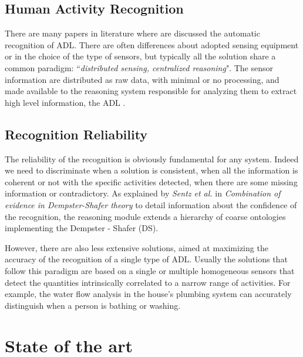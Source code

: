 \documentclass{thesisreport}
\begin{document}
\section{Human Activity Recognition}
There are many papers in literature where are discussed the automatic recognition of ADL. There are often differences about adopted sensing equipment or in the choice of the type of sensors, but typically all the solution share a common paradigm: ``\textit{distributed sensing, centralized reasoning}". The sensor information are distributed as raw data, with minimal or no processing, and made available to the reasoning system responsible for analyzing them to extract high level information, the ADL \cite{buoncompagni2017towards}.   


\section{Recognition Reliability} \label{reliability}
The reliability of the recognition is obviously fundamental for any system. Indeed we need to discriminate when a solution is consistent, when all the information is coherent or not with the specific activities detected, when there are some missing information or contradictory.
As explained by \textit{Sentz et al.} in \textit{Combination of evidence in Dempster-Shafer theory} \cite{sentz2002combination} to detail information about the confidence of the recognition, the reasoning module extends a hierarchy of coarse ontologies implementing the Dempster - Shafer (DS). 

However, there are also less extensive solutions, aimed at maximizing the accuracy of the recognition of a single type of ADL. Usually the solutions that follow this paradigm are based on a single or multiple homogeneous sensors that detect the quantities intrinsically correlated to a narrow range of activities. For example, the  water flow analysis in the house's plumbing system can accurately distinguish when a person is bathing or washing.

 \chapter{State of the art}
 
\end{document}
